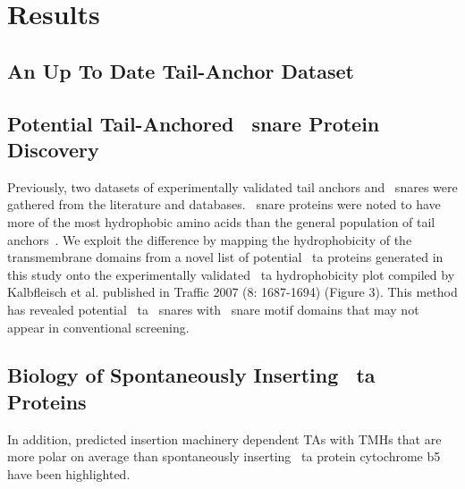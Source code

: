 \section{Results}

\subsection{An Up To Date Tail-Anchor Dataset}

\subsection{Potential Tail-Anchored ~\gls{snare} Protein Discovery}
Previously, two datasets of experimentally validated tail anchors and ~\gls{snare}s were gathered from the literature and databases.
~\gls{snare} proteins were noted to have more of the most hydrophobic amino acids than the general population of tail anchors~\cite{Kalbfleisch2007}.
We exploit the difference by mapping the hydrophobicity of the transmembrane domains from a novel list of potential ~\gls{ta} proteins generated in this study onto the experimentally validated ~\gls{ta} hydrophobicity plot compiled by Kalbfleisch et al. published in Traffic 2007 (8: 1687-1694) (Figure 3).
This method has revealed potential ~\gls{ta} ~\gls{snare}s with ~\gls{snare} motif domains that may not appear in conventional screening.

\subsection{Biology of Spontaneously Inserting ~\gls{ta} Proteins}
In addition, predicted insertion machinery dependent TAs with TMHs that are more polar on average than spontaneously inserting ~\gls{ta} protein cytochrome b5 have been highlighted.
